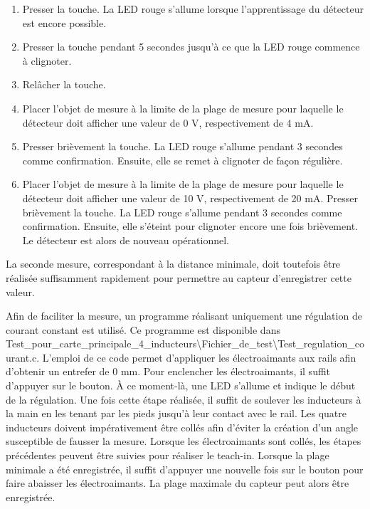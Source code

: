 \begin{enumerate}
    \item Presser la touche. La LED rouge s’allume lorsque l’apprentissage du détecteur est encore possible.

    \item Presser la touche pendant 5 secondes jusqu’à ce que la LED rouge commence à clignoter.

    \item Relâcher la touche.

    \item Placer l’objet de mesure à la limite de la plage de mesure pour laquelle le détecteur doit afficher une valeur de 0 V, respectivement de 4 mA.

    \item Presser brièvement la touche. La LED rouge s’allume pendant 3 secondes comme confirmation. Ensuite, elle se remet à clignoter de façon régulière.

    \item Placer l’objet de mesure à la limite de la plage de mesure pour laquelle le détecteur doit afficher une valeur de 10 V, respectivement de 20 mA. Presser brièvement la touche. La LED rouge s’allume pendant 3 secondes comme confirmation. Ensuite, elle s’éteint pour clignoter encore une fois brièvement. Le détecteur est alors de nouveau opérationnel.
\end{enumerate}

La seconde mesure, correspondant à la distance minimale, doit toutefois être réalisée suffisamment rapidement pour permettre au capteur d’enregistrer cette valeur.

Afin de faciliter la mesure, un programme réalisant uniquement une régulation de courant constant est utilisé. Ce programme est disponible dans Test\_pour\_carte\_principale\_4\_inducteurs\textbackslash Fichier\_de\_test\textbackslash Test\_regulation\_courant.c. L’emploi de ce code permet d’appliquer les électroaimants aux rails afin d’obtenir un entrefer de 0 mm. Pour enclencher les électroaimants, il suffit d’appuyer sur le bouton. À ce moment-là, une LED s’allume et indique le début de la régulation. Une fois cette étape réalisée, il suffit de soulever les inducteurs à la main en les tenant par les pieds jusqu’à leur contact avec le rail. Les quatre inducteurs doivent impérativement être collés afin d’éviter la création d’un angle susceptible de fausser la mesure. Lorsque les électroaimants sont collés, les étapes précédentes peuvent être suivies pour réaliser le teach-in. Lorsque la plage minimale a été enregistrée, il suffit d’appuyer une nouvelle fois sur le bouton pour faire abaisser les électroaimants. La plage maximale du capteur peut alors être enregistrée.

